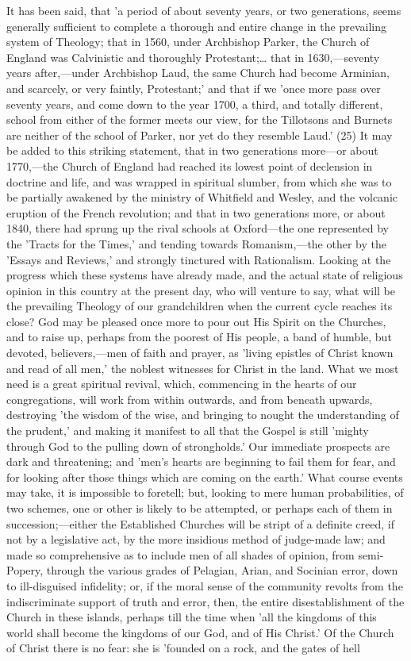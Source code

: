 \documentclass[
]{book}
\begin{document}
It has been said, that 'a period of about seventy years, or two generations, seems generally sufficient to complete a thorough and entire change in the prevailing system of Theology; that in 1560, under Archbishop Parker, the Church of England was Calvinistic and thoroughly Protestant;\ldots{} that in 1630,---seventy years after,---under Archbishop Laud, the same Church had become Arminian, and scarcely, or very faintly, Protestant;' and that if we 'once more pass over seventy years, and come down to the year 1700, a third, and totally different, school from either of the former meets our view, for the Tillotsons and Burnets are neither of the school of Parker, nor yet do they resemble Laud.' (25) It may be added to this striking statement, that in two generations more---or about 1770,---the Church of England had reached its lowest point of declension in doctrine and life, and was wrapped in spiritual slumber, from which she was to be partially awakened by the ministry of Whitfield and Wesley, and the volcanic eruption of the French revolution; and that in two generations more, or about 1840, there had sprung up the rival schools at Oxford---the one represented by the 'Tracts for the Times,' and tending towards Romanism,---the other by the 'Essays and Reviews,' and strongly tinctured with Rationalism. Looking at the progress which these systems have already made, and the actual state of religious opinion in this country at the present day, who will venture to say, what will be the prevailing Theology of our grandchildren when the current cycle reaches its close? God may be pleased once more to pour out His Spirit on the Churches, and to raise up, perhaps from the poorest of His people, a band of humble, but devoted, believers,---men of faith and prayer, as 'living epistles of Christ known and read of all men,' the noblest witnesses for Christ in the land. What we most need is a great spiritual revival, which, commencing in the hearts of our congregations, will work from within outwards, and from beneath upwards, destroying 'the wisdom of the wise, and bringing to nought the understanding of the prudent,' and making it manifest to all that the Gospel is still 'mighty through God to the pulling down of strongholds.' Our immediate prospects are dark and threatening; and 'men's hearts are beginning to fail them for fear, and for looking after those things which are coming on the earth.' What course events may take, it is impossible to foretell; but, looking to mere human probabilities, of two schemes, one or other is likely to be attempted, or perhaps each of them in succession;---either the Established Churches will be stript of a definite creed, if not by a legislative act, by the more insidious method of judge-made law; and made so comprehensive as to include men of all shades of opinion, from semi-Popery, through the various grades of Pelagian, Arian, and Socinian error, down to ill-disguised infidelity; or, if the moral sense of the community revolts from the indiscriminate support of truth and error, then, the entire disestablishment of the Church in these islands, perhaps till the time when 'all the kingdoms of this world shall become the kingdoms of our God, and of His Christ.' Of the Church of Christ there is no fear: she is 'founded on a rock, and the gates of hell 
\end{document}
